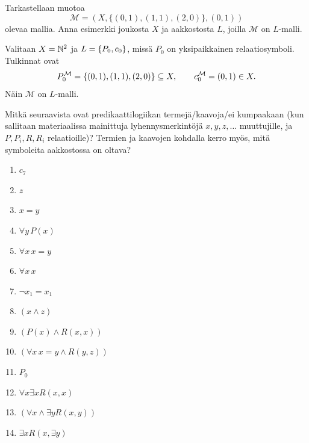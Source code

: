 \documentclass[11pt,a4paper]{amsart}
\begin{document}
\begin{exercise}
  Tarkastellaan muotoa
  \[
    \mathcal M = (X, \{(0,1), (1,1), (2,0)\}, (0,1))
  \]
  olevaa mallia. Anna esimerkki joukosta \(X\) ja aakkostosta \(L\), joilla
  \(\mathcal M\) on \(L\)-malli.
\end{exercise}

\begin{solution}
  Valitaan \(X = \mathbb{N}^2\) ja \(L = \left\lbrace P_0, c_0\right\rbrace\), missä \(P_0\) on
  yksipaikkainen relaatiosymboli. Tulkinnat ovat
  \[
    P_0^{\mathcal M} = \left\lbrace(0,1), (1,1), (2,0)\right\rbrace \subseteq X,
    \qquad c_0^{\mathcal M} = (0,1) \in X.
  \]
  Näin \(\mathcal M\) on \(L\)-malli.
\end{solution}

\begin{exercise}
  Mitkä seuraavista ovat predikaattilogiikan termejä/kaavoja/ei kumpaakaan
  (kun sallitaan materiaalissa mainittuja lyhennysmerkintöjä
  \(x, y, z, \ldots\) muuttujille, ja \(P, P_i, R, R_i\) relaatioille)?
  Termien ja kaavojen kohdalla kerro myös, mitä symboleita
  aakkostossa on oltava?
  \begin{enumerate}[label=(\alph*)]
    \item \(c_7\)
    \item \(z\)
    \item \(x = y\)
    \item \(\forall y\, P(x)\)
    \item \(\forall x\, x = y\)
    \item \(\forall x\, x\)
    \item \(\neg x_1 = x_1\)
    \item \((x \land z)\)
    \item \((P(x) \land R(x,x))\)
    \item \((\forall x\, x = y \land R(y,z))\)
    \item \(P_0\)
    \item \(\forall x\exists x R(x,x)\)
    \item \((\forall x \land \exists y R(x,y))\)
    \item \(\exists x R(x,\exists y)\)
  \end{enumerate}
\end{exercise}
\end{document}

